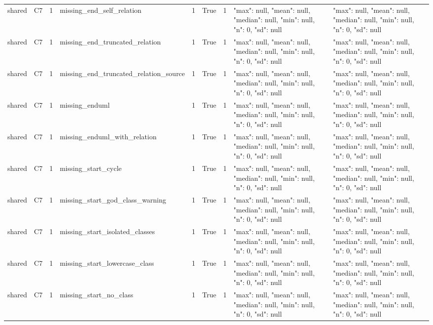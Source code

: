 \begin{tabular}{lllllllll}
shared & C7 & 1 & missing\_end\_self\_relation & 1 & True & 1 & {"max": null, "mean": null, "median": null, "min": null, "n": 0, "sd": null} & {"max": null, "mean": null, "median": null, "min": null, "n": 0, "sd": null} \\
shared & C7 & 1 & missing\_end\_truncated\_relation & 1 & True & 1 & {"max": null, "mean": null, "median": null, "min": null, "n": 0, "sd": null} & {"max": null, "mean": null, "median": null, "min": null, "n": 0, "sd": null} \\
shared & C7 & 1 & missing\_end\_truncated\_relation\_source & 1 & True & 1 & {"max": null, "mean": null, "median": null, "min": null, "n": 0, "sd": null} & {"max": null, "mean": null, "median": null, "min": null, "n": 0, "sd": null} \\
shared & C7 & 1 & missing\_enduml & 1 & True & 1 & {"max": null, "mean": null, "median": null, "min": null, "n": 0, "sd": null} & {"max": null, "mean": null, "median": null, "min": null, "n": 0, "sd": null} \\
shared & C7 & 1 & missing\_enduml\_with\_relation & 1 & True & 1 & {"max": null, "mean": null, "median": null, "min": null, "n": 0, "sd": null} & {"max": null, "mean": null, "median": null, "min": null, "n": 0, "sd": null} \\
shared & C7 & 1 & missing\_start\_cycle & 1 & True & 1 & {"max": null, "mean": null, "median": null, "min": null, "n": 0, "sd": null} & {"max": null, "mean": null, "median": null, "min": null, "n": 0, "sd": null} \\
shared & C7 & 1 & missing\_start\_god\_class\_warning & 1 & True & 1 & {"max": null, "mean": null, "median": null, "min": null, "n": 0, "sd": null} & {"max": null, "mean": null, "median": null, "min": null, "n": 0, "sd": null} \\
shared & C7 & 1 & missing\_start\_isolated\_classes & 1 & True & 1 & {"max": null, "mean": null, "median": null, "min": null, "n": 0, "sd": null} & {"max": null, "mean": null, "median": null, "min": null, "n": 0, "sd": null} \\
shared & C7 & 1 & missing\_start\_lowercase\_class & 1 & True & 1 & {"max": null, "mean": null, "median": null, "min": null, "n": 0, "sd": null} & {"max": null, "mean": null, "median": null, "min": null, "n": 0, "sd": null} \\
shared & C7 & 1 & missing\_start\_no\_class & 1 & True & 1 & {"max": null, "mean": null, "median": null, "min": null, "n": 0, "sd": null} & {"max": null, "mean": null, "median": null, "min": null, "n": 0, "sd": null} \\

\end{tabular}
